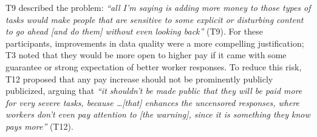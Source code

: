 T9 described the problem: \textit{``all I'm saying is adding more money to those types of tasks would make people that are sensitive to some explicit or disturbing content to go ahead [and do them] without even looking back''} (T9).  
For these participants, improvements in data quality were a more compelling justification; T3 noted that they would be more open to higher pay if it came with some guarantee or strong expectation of better worker responses. To reduce this risk, T12 proposed that any pay increase should not be prominently publicly publicized, arguing that \textit{``it shouldn't be made public that they will be paid more for very severe tasks, because \dots [that] enhances the uncensored responses, where workers don't even pay attention to [the warning], since it is something they know pays more''} (T12). 
